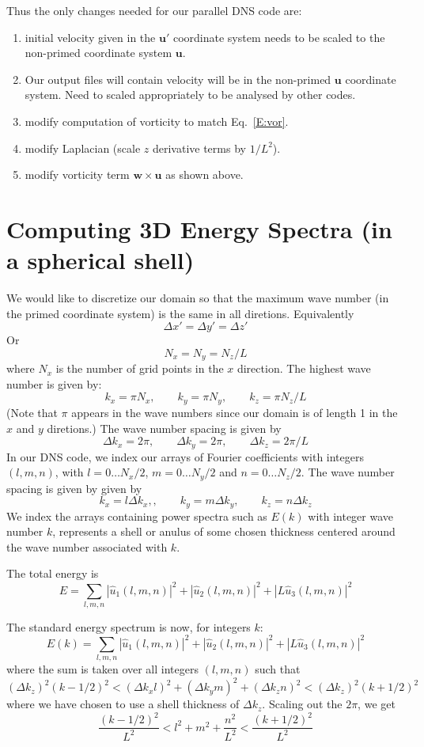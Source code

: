 \documentclass[12pt]{article}
\newcommand{\uv}{\mathbf u}
\newcommand{\up}{\mathbf u'}
\newcommand{\w}{\mathbf w}
\begin{document}
\newpage
Thus the only changes needed for our parallel DNS code are:
\begin{enumerate}
\item initial velocity given in the $\up$ coordinate system 
needs to be scaled to the non-primed coordinate system $\uv$.
\item Our output files will contain velocity will be in the non-primed 
$\uv$ coordinate system.  Need to scaled appropriately  to be analysed
by other codes.
\item modify computation of vorticity to match Eq.~\ref{E:vor}.
\item modify Laplacian (scale $z$ derivative terms by $1/L^2$).
\item modify vorticity term $\w \times \uv$ as shown above.
\end{enumerate}



\section{Computing 3D Energy Spectra (in a spherical shell)}
We would like to discretize our domain so that the 
maximum wave number (in the primed coordinate system) is
the same in all diretions.  Equivalently
\[
\Delta x' = \Delta y' = \Delta z'
\]
Or
\[
N_x  = N_y = N_z/L
\]
where $N_x$ is the number of grid points in the $x$ direction.
The highest wave number is given by:
\[
k_x = \pi N_x, \qquad k_y = \pi N_y, \qquad k_z = \pi N_z/L 
\]
(Note that $\pi$ appears in the wave numbers since our domain is
of length 1 in the $x$ and $y$ diretions.)  The wave number spacing
is given by
\[
\Delta k_x = 2 \pi, \qquad  \Delta k_y = 2 \pi, \qquad  \Delta k_z = 2 \pi / L 
\]
In our DNS code, we index our arrays of Fourier coefficients
with integers $(l,m,n)$, with $l=0 \dots N_x/2$, 
$m=0 \dots N_y/2$ and 
$n=0 \dots N_z/2$.  The wave number spacing is given by
given by
\[
k_x = l \Delta k_x,, \qquad  k_y = m \Delta k_y, \qquad  k_z = n  \Delta k_z
\]
We index the arrays containing power spectra
such as $E(k)$ with integer wave number $k$, represents a shell or anulus
of some chosen thickness centered around the wave number associated
with $k$.

The total energy is
\[
E  = \sum_{l,m,n}  |  {\hat u_1}(l,m,n) |^2 +
 |  {\hat u_2}(l,m,n) |^2 + 
 |  L {\hat u_3}(l,m,n) |^2
\]

The standard energy spectrum is now, for integers $k$:
\[
E(k)  = \sum_{l,m,n}  |  {\hat u_1}(l,m,n) |^2 +
 |  {\hat u_2}(l,m,n) |^2 + 
 |  L {\hat u_3}(l,m,n) |^2
\]
where the sum is taken over all integers $(l,m,n)$ such that
\[
(\Delta k_z)^2 (k-1/2)^2 < (\Delta k_x l)^2 + (\Delta k_y m)^2 + (\Delta k_z n)^2 <  (\Delta k_z)^2 (k+1/2)^2 
\]
where we have chosen to use a shell thickness of $\Delta k_z$.
 Scaling out the $2\pi$, we get
\[
\frac{(k-1/2)^2}{L^2} < l^2 + m^2 + \frac{n^2}{L^2} < \frac{(k+1/2)^2}{L^2}
\]  
\end{document}
